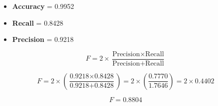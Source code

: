 \documentclass[]{report}
\begin{document}
\begin{itemize}
\item \textbf{Accuracy} = 0.9952
\item \textbf{Recall} = 0.8428
\item \textbf{Precision} = 0.9218
\end{itemize}




\[ F = 2 \times \frac{\mbox{Precision} \times \mbox{Recall}}{\mbox{Precision} + \mbox{Recall}}\]\bigskip



\[ F = 2 \times \left( \frac{\mbox{0.9218} \times \mbox{0.8428}}{\mbox{0.9218} + \mbox{0.8428}} \right)= 2 \times \left( \frac{0.7770}{1.7646} \right) = 2 \times 0.4402 \]
{

\[F = 0.8804\] 
}
\end{document}
